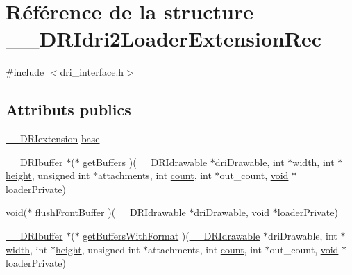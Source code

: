 \hypertarget{struct_____d_r_idri2_loader_extension_rec}{\section{Référence de la structure \-\_\-\-\_\-\-D\-R\-Idri2\-Loader\-Extension\-Rec}
\label{struct_____d_r_idri2_loader_extension_rec}
}


{\ttfamily \#include $<$dri\-\_\-interface.\-h$>$}

\subsection*{Attributs publics}
\begin{DoxyCompactItemize}
\item 
\hyperlink{dri__interface_8h_a4e0a61c8ece00d2b2c6792a9a1b55385}{\-\_\-\-\_\-\-D\-R\-Iextension} \hyperlink{struct_____d_r_idri2_loader_extension_rec_a017db553ff9b672e344aca9f6846711e}{base}
\item 
\hyperlink{dri__interface_8h_a99ccb036a4865817ec4d06d153ba2446}{\-\_\-\-\_\-\-D\-R\-Ibuffer} $\ast$($\ast$ \hyperlink{struct_____d_r_idri2_loader_extension_rec_aaddcff60eea6077e13b8f240bca17851}{get\-Buffers} )(\hyperlink{dri__interface_8h_a5bfb832a0a08208d95b3bbef439d2262}{\-\_\-\-\_\-\-D\-R\-Idrawable} $\ast$dri\-Drawable, int $\ast$\hyperlink{gl_8h_a30a197eaed803ac3cd1b444d4c972354}{width}, int $\ast$\hyperlink{gl_8h_aab021b2df174b06135ca6744356dcf34}{height}, unsigned int $\ast$attachments, int \hyperlink{gl_8h_a4e867eee5910f6b2df6123b47ab70dae}{count}, int $\ast$out\-\_\-count, \hyperlink{glu_8h_a4292190e3f1f6b373a760c7d9316ad3c}{void} $\ast$loader\-Private)
\item 
\hyperlink{glu_8h_a4292190e3f1f6b373a760c7d9316ad3c}{void}($\ast$ \hyperlink{struct_____d_r_idri2_loader_extension_rec_a0acfcc5a94fa38e1df5fba2c99f26d47}{flush\-Front\-Buffer} )(\hyperlink{dri__interface_8h_a5bfb832a0a08208d95b3bbef439d2262}{\-\_\-\-\_\-\-D\-R\-Idrawable} $\ast$dri\-Drawable, \hyperlink{glu_8h_a4292190e3f1f6b373a760c7d9316ad3c}{void} $\ast$loader\-Private)
\item 
\hyperlink{dri__interface_8h_a99ccb036a4865817ec4d06d153ba2446}{\-\_\-\-\_\-\-D\-R\-Ibuffer} $\ast$($\ast$ \hyperlink{struct_____d_r_idri2_loader_extension_rec_a4fc1ed3cfad3c47df68f9c4d555760b2}{get\-Buffers\-With\-Format} )(\hyperlink{dri__interface_8h_a5bfb832a0a08208d95b3bbef439d2262}{\-\_\-\-\_\-\-D\-R\-Idrawable} $\ast$dri\-Drawable, int $\ast$\hyperlink{gl_8h_a30a197eaed803ac3cd1b444d4c972354}{width}, int $\ast$\hyperlink{gl_8h_aab021b2df174b06135ca6744356dcf34}{height}, unsigned int $\ast$attachments, int \hyperlink{gl_8h_a4e867eee5910f6b2df6123b47ab70dae}{count}, int $\ast$out\-\_\-count, \hyperlink{glu_8h_a4292190e3f1f6b373a760c7d9316ad3c}{void} $\ast$loader\-Private)
\end{DoxyCompactItemize}



